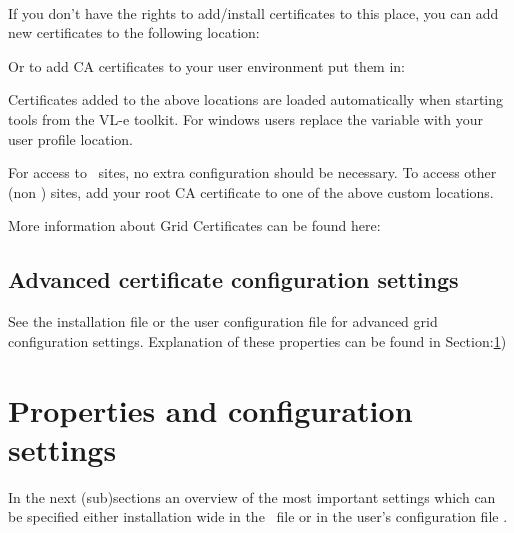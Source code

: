 	\tab {}\\
	
If you don't have the rights to add/install certificates to this place, you can 
add new certificates to the following location: 

	\tab \VLETINSTALL{}

Or to add CA certificates to your user environment put them in: 

	\tab {} 

Certificates added to the above locations are loaded automatically
when starting tools from the VL-e toolkit. 
For windows users replace the  variable with your user profile
location. 

For access to \dutchgrid\ sites, no extra configuration should be necessary. To
access other (non \dutchgrid) sites, add your root CA certificate to one of
the above custom locations. 

More information about Grid Certificates can be found here: \cite{288111}


\subsection{Advanced certificate configuration settings}
See the installation file  or the user
configuration file  for advanced
grid configuration settings. 
Explanation of these properties can be found in Section:\ref{sec:properties})


\section{Properties and configuration settings}
\label{sec:properties}

In the next (sub)sections an overview of the most important settings which can
be specified either installation wide in the \VLETCONF\ file or in the user's
configuration file \VLETUSERCONF. 


